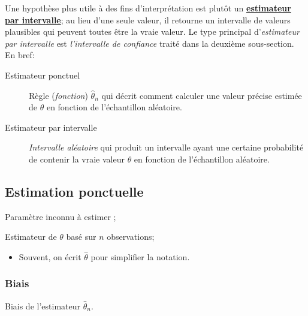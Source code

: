 \documentclass[10pt, french]{article}
\begin{document}
\begin{multicols*}{2}
Une hypothèse plus utile à des fins d'interprétation est plutôt un \textbf{\hyperref[sec:int-estimation]{estimateur par intervalle}}; au lieu d'une seule valeur, il retourne un intervalle de valeurs plausibles qui peuvent toutes être la vraie valeur. 
Le type principal d'\textit{estimateur par intervalle} est \textit{l'intervalle de confiance} traité dans la deuxième sous-section.\\

En bref:
\begin{description}
	\item[Estimateur ponctuel]	Règle (\textit{fonction}) $\hat{\theta}_{n}$ qui décrit comment calculer une valeur précise estimée de $\theta$ en fonction de l'échantillon aléatoire. 
	\item[Estimateur par intervalle]	\textit{Intervalle aléatoire} qui produit un intervalle ayant une certaine probabilité de contenir la vraie valeur $\theta$ en fonction de l'échantillon aléatoire.
\end{description}



\subsection{Estimation ponctuelle}
\begin{distributions}[Notation]
\begin{description}[font = \normalfont]
	\item[$\theta$]	Paramètre inconnu à estimer ;
	\item[$\hat{\theta}_{n}$]	Estimateur de $\theta$ basé sur $n$ observations;
		\begin{itemize}[leftmargin = *]
		\item	Souvent, on écrit $\hat{\theta}$ pour simplifier la notation.
		\end{itemize}
\end{description}
\end{distributions}



\columnbreak	
\subsubsection{Biais}
\begin{distributions}[Notation]
\begin{description}[font = \normalfont]
	\item[$\text{B}(\hat{\theta}_{n})$]	Biais de l'estimateur $\hat{\theta}_{n}$.
\end{description}
\end{distributions}


\end{multicols*}
\end{document}
